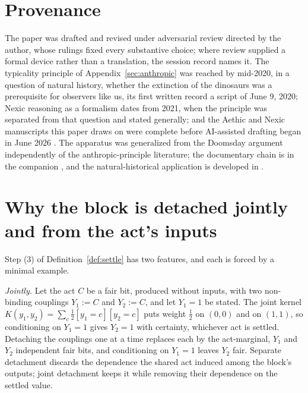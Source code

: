 \section*{Provenance} The paper was drafted and revised under adversarial review directed by the author, whose rulings fixed every substantive choice; where review supplied a formal device rather than a translation, the session record names it. %
The typicality principle of Appendix~\ref{sec:anthropic} was reached by mid-2020, in a question of natural history, whether the extinction of the dinosaurs was a prerequisite for observers like us, its first written record a script of June 9, 2020; Nexic reasoning as a formalism dates from 2021, when the principle was separated from that question and stated generally; and the Aethic and Nexic manuscripts this paper draws on were complete before AI-assisted drafting began in June 2026 \cite{Nexus}. The apparatus was generalized from the Doomsday argument \cite{gott1993implications, leslie1996end} independently of the anthropic-principle literature; the documentary chain is in the companion \cite{Nexus}, and the natural-historical application is developed in \cite{NexicFoundation}.

\appendix
\section{Why the block is detached jointly and from the act's inputs}\label{sec:withdrawn-operators}

\noindent Step (3) of Definition~\ref{def:settle} has two features, and each is forced by a minimal example.

\emph{Jointly.} Let the act $C$ be a fair bit, produced without inputs, with two non-binding couplings $Y_1 := C$ and $Y_2 := C$, and let $Y_1 = 1$ be stated. The joint kernel $K(y_1, y_2) = \sum_c \tfrac12 [y_1 = c][y_2 = c]$ puts weight $\tfrac12$ on $(0,0)$ and on $(1,1)$, so conditioning on $Y_1 = 1$ gives $Y_2 = 1$ with certainty, whichever act is settled. Detaching the couplings one at a time replaces each by the act-marginal, $Y_1$ and $Y_2$ independent fair bits, and conditioning on $Y_1 = 1$ leaves $Y_2$ fair. Separate detachment discards the dependence the shared act induced among the block's outputs; joint detachment keeps it while removing their dependence on the settled value.

